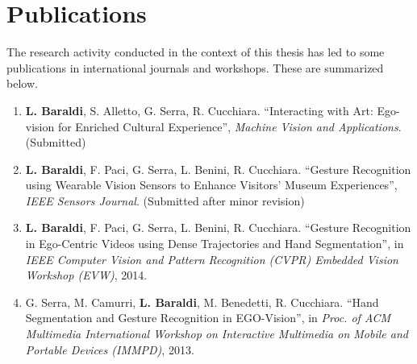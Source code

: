 
\chapter{Publications} %

\label{AppendixA} %


The research activity conducted in the context of this thesis has led to some publications in international journals
and workshops. These are summarized below.

\begin{enumerate}
\item \textbf{L. Baraldi}, S. Alletto, G. Serra, R. Cucchiara. ``Interacting with Art: Ego-vision for Enriched Cultural Experience'', \textit{Machine Vision and Applications}. (Submitted)
\item \textbf{L. Baraldi}, F. Paci, G. Serra, L. Benini, R. Cucchiara. ``Gesture Recognition using Wearable Vision Sensors to Enhance Visitors’ Museum Experiences'', \textit{IEEE Sensors Journal}. (Submitted after minor revision)
\item \textbf{L. Baraldi}, F. Paci, G. Serra, L. Benini, R. Cucchiara. ``Gesture Recognition in Ego-Centric Videos using Dense Trajectories and Hand Segmentation'', in \textit{IEEE Computer Vision and Pattern Recognition (CVPR) Embedded Vision Workshop (EVW)}, 2014.
\item G. Serra, M. Camurri, \textbf{L. Baraldi}, M. Benedetti, R. Cucchiara. ``Hand Segmentation and Gesture Recognition in EGO-Vision'', in \textit{Proc. of ACM Multimedia International Workshop on Interactive Multimedia on Mobile and Portable Devices (IMMPD)}, 2013.
\end{enumerate}